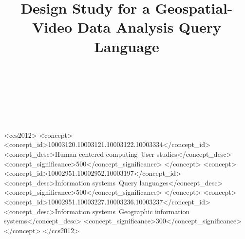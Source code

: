 \documentclass{sigchi}
\numberwithin{figure}{subsection}
\def\plaintitle{Design Study for a Geospatial-Video Data Analysis Query Language}
\begin{document}
\title{\plaintitle}

\author{%
  \\
  \\
  \\
  \\
}

\maketitle

\newcommand{\note}[2]{\textcolor{#1}{[#2]}}
\newcommand{\mick}[1]{\note{blue}{Mick: #1}}
\newcommand{\shadaj}[1]{\note{cyan}{Shadaj: #1}}
\newcommand{\andrew}[1]{\note{teal}{Andrew: #1}}
\newcommand{\amy}[1]{\note{orange}{Amy: #1}}
\newcommand{\todo}[1]{\note{red}{Todo: #1}}



\begin{CCSXML}
<ccs2012>
   <concept>
       <concept_id>10003120.10003121.10003122.10003334</concept_id>
       <concept_desc>Human-centered computing~User studies</concept_desc>
       <concept_significance>500</concept_significance>
       </concept>
   <concept>
       <concept_id>10002951.10002952.10003197</concept_id>
       <concept_desc>Information systems~Query languages</concept_desc>
       <concept_significance>500</concept_significance>
       </concept>
   <concept>
       <concept_id>10002951.10003227.10003236.10003237</concept_id>
       <concept_desc>Information systems~Geographic information systems</concept_desc>
       <concept_significance>300</concept_significance>
       </concept>
 </ccs2012>
\end{CCSXML}

\end{document}
